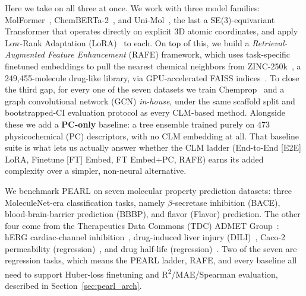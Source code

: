 \documentclass[pdflatex,sn-mathphys-num]{sn-jnl}%
\begin{document}
Here we take on all three at once. We work with three model families: MolFormer~\cite{ross2022molformer}, ChemBERTa-2~\cite{ahmad2022chemberta2}, and Uni-Mol~\cite{zhou2023unimol}, the last a SE(3)-equivariant Transformer that operates directly on explicit 3D atomic coordinates, and apply Low-Rank Adaptation (LoRA)~\cite{hu2021lora} to each. On top of this, we build a \emph{Retrieval-Augmented Feature Enhancement} (RAFE) framework, which uses task-specific finetuned embeddings to pull the nearest chemical neighbors from ZINC-250k~\cite{gomez2018automatic}, a 249,455-molecule drug-like library, via GPU-accelerated FAISS indices~\cite{johnson2021faiss}. To close the third gap, for every one of the seven datasets we train Chemprop~\cite{yang2019chemprop} and a graph convolutional network (GCN) \emph{in-house}, under the same scaffold split and bootstrapped-CI evaluation protocol as every CLM-based method. Alongside these we add a \textbf{PC-only} baseline: a tree ensemble trained purely on 473 physicochemical (PC) descriptors, with no CLM embedding at all. That baseline suite is what lets us actually answer whether the CLM ladder (End-to-End [E2E] LoRA, Finetune [FT] Embed, FT Embed+PC, RAFE) earns its added complexity over a simpler, non-neural alternative.

We benchmark PEARL on seven molecular property prediction datasets: three MoleculeNet-era classification tasks, namely $\beta$-secretase inhibition (BACE), blood-brain-barrier prediction (BBBP), and flavor (Flavor) prediction. The other four come from the Therapeutics Data Commons (TDC) ADMET Group~\cite{huang2021tdc}: hERG cardiac-channel inhibition~\cite{wang2016herg}, drug-induced liver injury (DILI)~\cite{xu2019dili}, Caco-2 permeability (regression)~\cite{wang2016caco2}, and drug half-life (regression)~\cite{obach2008half}. Two of the seven are regression tasks, which means the PEARL ladder, RAFE, and every baseline all need to support Huber-loss finetuning and R\textsuperscript{2}/MAE/Spearman evaluation, described in Section~\ref{sec:pearl_arch}.
\end{document}
